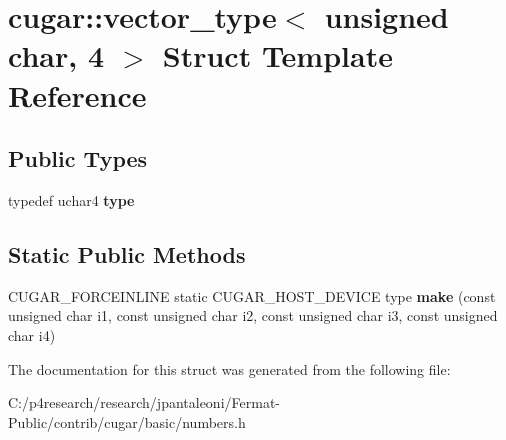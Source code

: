 \hypertarget{structcugar_1_1vector__type_3_01unsigned_01char_00_014_01_4}{}\section{cugar\+:\+:vector\+\_\+type$<$ unsigned char, 4 $>$ Struct Template Reference}
\label{structcugar_1_1vector__type_3_01unsigned_01char_00_014_01_4}
\subsection*{Public Types}
\begin{DoxyCompactItemize}
\item 
\mbox{\label{structcugar_1_1vector__type_3_01unsigned_01char_00_014_01_4_a67da39730c6c6e53659572010cdbd7ce}} 
typedef uchar4 {\bfseries type}
\end{DoxyCompactItemize}
\subsection*{Static Public Methods}
\begin{DoxyCompactItemize}
\item 
\mbox{\label{structcugar_1_1vector__type_3_01unsigned_01char_00_014_01_4_ad6f7039dc0032a21d630ab973277cbd5}} 
C\+U\+G\+A\+R\+\_\+\+F\+O\+R\+C\+E\+I\+N\+L\+I\+NE static C\+U\+G\+A\+R\+\_\+\+H\+O\+S\+T\+\_\+\+D\+E\+V\+I\+CE type {\bfseries make} (const unsigned char i1, const unsigned char i2, const unsigned char i3, const unsigned char i4)
\end{DoxyCompactItemize}


The documentation for this struct was generated from the following file\+:\begin{DoxyCompactItemize}
\item 
C\+:/p4research/research/jpantaleoni/\+Fermat-\/\+Public/contrib/cugar/basic/numbers.\+h\end{DoxyCompactItemize}
